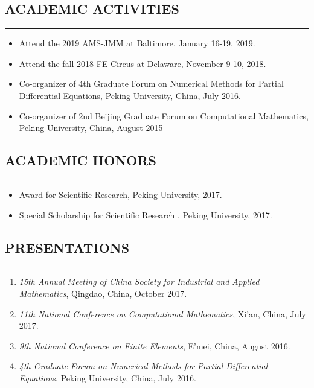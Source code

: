 \documentclass[10pt,a4]{article}
\begin{document}
\begin{small}
\subsection*{ACADEMIC ACTIVITIES}
\hrule
\vspace{0.2cm}
\begin{itemize}
	\item Attend the 2019 AMS-JMM at Baltimore, January 16-19, 2019.
	\item Attend the fall 2018 FE Circus at Delaware, November 9-10, 2018.
	\item Co-organizer of 4th Graduate Forum on Numerical Methods for Partial Differential Equations, Peking University, China, July 2016.
	\item Co-organizer of 2nd Beijing Graduate Forum on Computational Mathematics, Peking University, China, August 2015
\end{itemize}
 
\subsection*{ACADEMIC HONORS}
\hrule
\vspace{0.2cm}
\begin{itemize}
	\item Award for Scientific Research, Peking University, 2017.
	\item Special Scholarship for Scientific Research , Peking University, 2017.
\end{itemize}
 
\subsection*{PRESENTATIONS}
\hrule
\vspace{0.2cm}

\begin{enumerate}
    \item 
       {\it 15th Annual Meeting of China Society for Industrial and Applied Mathematics}, Qingdao, China, October 2017. 

    \item  
       {\it 11th National Conference on Computational Mathematics}, Xi'an, China, July 2017. 

    \item 
       {\it 9th National Conference on Finite Elements}, E'mei, China, August 2016. 

    \item  
       {\it 4th Graduate Forum on Numerical Methods for Partial Differential Equations}, Peking University, China, July 2016. 
   

\end{enumerate}
\end{small}
\end{document}
